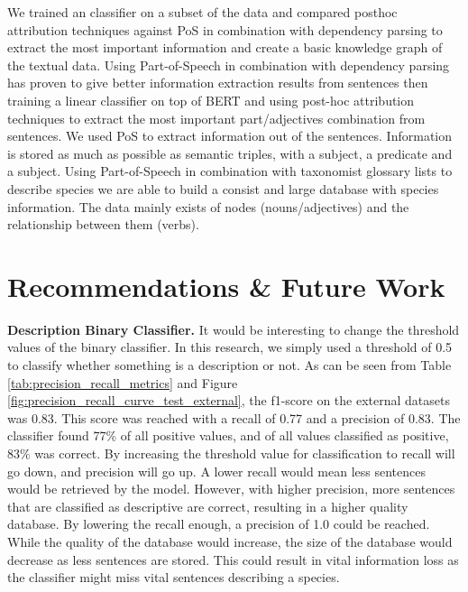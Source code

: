 \documentclass[a4paper, 12pt, oneside]{book} %
\begin{document}
We trained an classifier on a subset of the data and compared posthoc attribution techniques against PoS in combination with dependency parsing to extract the most important information and create a basic knowledge graph of the textual data.
Using Part-of-Speech in combination with dependency parsing has proven to give better information extraction results from sentences then training a linear classifier on top of BERT and using post-hoc attribution techniques to extract the most important part/adjectives combination from sentences.
We used PoS to extract information out of the sentences.
Information is stored as much as possible as semantic triples, with a subject, a predicate and a subject.
Using Part-of-Speech in combination with taxonomist glossary lists to describe species we are able to build a consist and large database with species information.
The data mainly exists of nodes (nouns/adjectives) and the relationship between them (verbs).


\newpage
\section{Recommendations \& Future Work} \label{par:future}
\textbf{Description Binary Classifier.}
It would be interesting to change the threshold values of the binary classifier.
In this research, we simply used a threshold of 0.5 to classify whether something is a description or not.
As can be seen from Table \ref{tab:precision_recall_metrics} and Figure \ref{fig:precision_recall_curve_test_external}, the f1-score on the external datasets was 0.83. 
This score was reached with a recall of 0.77 and a precision of 0.83.
The classifier found 77\% of all positive values, and of all values classified as positive, 83\% was correct.
By increasing the threshold value for classification to recall will go down, and precision will go up.
A lower recall would mean less sentences would be retrieved by the model.
However, with higher precision, more sentences that are classified as descriptive are correct, resulting in a higher quality database.
By lowering the recall enough, a precision of 1.0 could be reached.
While the quality of the database would increase, the size of the database would decrease as less sentences are stored.
This could result in vital information loss as the classifier might miss vital sentences describing a species.

\end{document}
